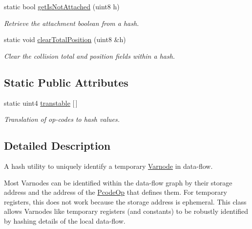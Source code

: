 \begin{DoxyCompactItemize}
static bool \mbox{\hyperlink{class_dynamic_hash_a670928958cd93677cc459e9b4f063fd3}{get\+Is\+Not\+Attached}} (uint8 h)
\begin{DoxyCompactList}\small\item\em Retrieve the attachment boolean from a hash. \end{DoxyCompactList}\item 
static void \mbox{\hyperlink{class_dynamic_hash_a4eb9f9e5767cc8c956a0111d4a5ca89b}{clear\+Total\+Position}} (uint8 \&h)
\begin{DoxyCompactList}\small\item\em Clear the collision total and position fields within a hash. \end{DoxyCompactList}\end{DoxyCompactItemize}
\subsection*{Static Public Attributes}
\begin{DoxyCompactItemize}
\item 
static uint4 \mbox{\hyperlink{class_dynamic_hash_a63ef9a666444db8c81bce80dd96bb965}{transtable}} \mbox{[}$\,$\mbox{]}
\begin{DoxyCompactList}\small\item\em Translation of op-\/codes to hash values. \end{DoxyCompactList}\end{DoxyCompactItemize}


\subsection{Detailed Description}
A hash utility to uniquely identify a temporary \mbox{\hyperlink{class_varnode}{Varnode}} in data-\/flow. 

Most Varnodes can be identified within the data-\/flow graph by their storage address and the address of the \mbox{\hyperlink{class_pcode_op}{Pcode\+Op}} that defines them. For temporary registers, this does not work because the storage address is ephemeral. This class allows Varnodes like temporary registers (and constants) to be robustly identified by hashing details of the local data-\/flow.

